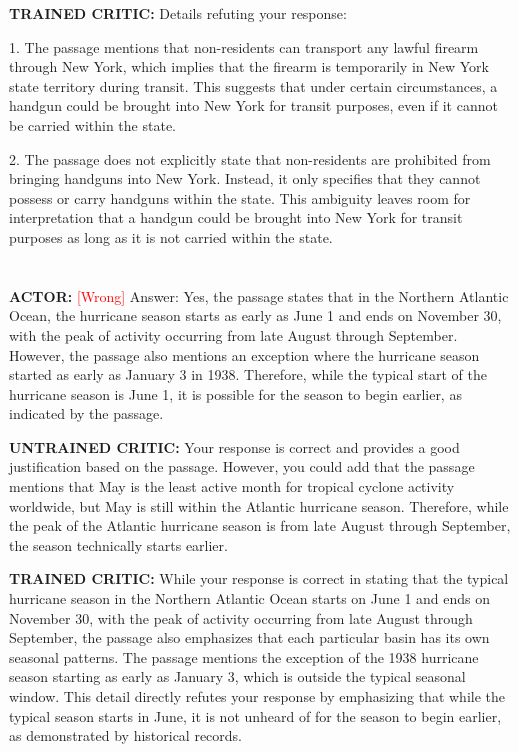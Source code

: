 \textbf{TRAINED CRITIC: }
 Details refuting your response:
 
1. The passage mentions that non-residents can transport any lawful firearm through New York, which implies that the firearm is temporarily in New York state territory during transit. This suggests that under certain circumstances, a handgun could be brought into New York for transit purposes, even if it cannot be carried within the state.

2. The passage does not explicitly state that non-residents are prohibited from bringing handguns into New York. Instead, it only specifies that they cannot possess or carry handguns within the state. This ambiguity leaves room for interpretation that a handgun could be brought into New York for transit purposes as long as it is not carried within the state.
\section*{}


\section*{}

\textbf{ACTOR:} \textcolor{red}{[Wrong]}
 Answer: Yes, the passage states that in the Northern Atlantic Ocean, the hurricane season starts as early as June 1 and ends on November 30, with the peak of activity occurring from late August through September. However, the passage also mentions an exception where the hurricane season started as early as January 3 in 1938. Therefore, while the typical start of the hurricane season is June 1, it is possible for the season to begin earlier, as indicated by the passage.


\textbf{UNTRAINED CRITIC:}
 Your response is correct and provides a good justification based on the passage. However, you could add that the passage mentions that May is the least active month for tropical cyclone activity worldwide, but May is still within the Atlantic hurricane season. Therefore, while the peak of the Atlantic hurricane season is from late August through September, the season technically starts earlier.



\textbf{TRAINED CRITIC:}
 While your response is correct in stating that the typical hurricane season in the Northern Atlantic Ocean starts on June 1 and ends on November 30, with the peak of activity occurring from late August through September, the passage also emphasizes that each particular basin has its own seasonal patterns. The passage mentions the exception of the 1938 hurricane season starting as early as January 3, which is outside the typical seasonal window. This detail directly refutes your response by emphasizing that while the typical season starts in June, it is not unheard of for the season to begin earlier, as demonstrated by historical records.

